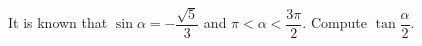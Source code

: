 It is known that $\sin{\alpha}=-\dfrac{\sqrt{5}}{3}$ and $\pi<\alpha<\dfrac{3\pi}{2}$. Compute $\tan{\dfrac{\alpha}{2}}$.
